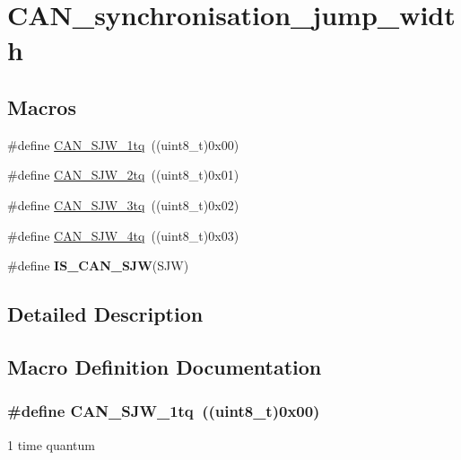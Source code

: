 \hypertarget{group___c_a_n__synchronisation__jump__width}{\section{C\-A\-N\-\_\-synchronisation\-\_\-jump\-\_\-width}
\label{group___c_a_n__synchronisation__jump__width}
}
\subsection*{Macros}
\begin{DoxyCompactItemize}
\item 
\#define \hyperlink{group___c_a_n__synchronisation__jump__width_ga4e03d22ae683b63cb4df238449ec967c}{C\-A\-N\-\_\-\-S\-J\-W\-\_\-1tq}~((uint8\-\_\-t)0x00)
\item 
\#define \hyperlink{group___c_a_n__synchronisation__jump__width_gad39e7656c555cc00bc4d7c1bff39916f}{C\-A\-N\-\_\-\-S\-J\-W\-\_\-2tq}~((uint8\-\_\-t)0x01)
\item 
\#define \hyperlink{group___c_a_n__synchronisation__jump__width_gab4de740e2184aac71c2c8cba22a8ecd2}{C\-A\-N\-\_\-\-S\-J\-W\-\_\-3tq}~((uint8\-\_\-t)0x02)
\item 
\#define \hyperlink{group___c_a_n__synchronisation__jump__width_ga7f26a36d478c7ba1a1441b369d62f693}{C\-A\-N\-\_\-\-S\-J\-W\-\_\-4tq}~((uint8\-\_\-t)0x03)
\item 
\#define {\bfseries I\-S\-\_\-\-C\-A\-N\-\_\-\-S\-J\-W}(S\-J\-W)
\end{DoxyCompactItemize}


\subsection{Detailed Description}


\subsection{Macro Definition Documentation}
\hypertarget{group___c_a_n__synchronisation__jump__width_ga4e03d22ae683b63cb4df238449ec967c}{
\subsubsection[{C\-A\-N\-\_\-\-S\-J\-W\-\_\-1tq}]{\setlength{\rightskip}{0pt plus 5cm}\#define C\-A\-N\-\_\-\-S\-J\-W\-\_\-1tq~((uint8\-\_\-t)0x00)}}\label{group___c_a_n__synchronisation__jump__width_ga4e03d22ae683b63cb4df238449ec967c}
1 time quantum 

